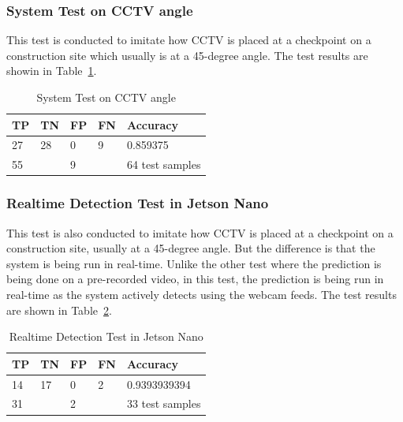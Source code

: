 \subsubsection{System Test on CCTV angle}
\label{subsubsec:hedect_test_cctv}

\par This test is conducted to imitate how CCTV is placed at a checkpoint on a construction site which usually is at a 45-degree angle. The test results are showin in Table~\ref{tb:systest_cctv}.

\begin{table}
  \centering
  \caption{System Test on CCTV angle}
  \label{tb:systest_cctv}
  \begin{tabular}{|l|l|l|l|l|} 
  \hline
  TP & TN & FP & FN & Accuracy         \\ 
  \hline
  27 & 28 & 0  & 9  & 0.859375         \\ 
  \hline
  \multicolumn{2}{|l|}{55}   & \multicolumn{2}{l|}{9} & 64 test samples  \\
  \hline
  \end{tabular}
\end{table}


\subsubsection{Realtime Detection Test in Jetson Nano}
\label{subsubsec:hedect_test_cctv_jetsonanno}

\par This test is also conducted to imitate how CCTV is placed at a checkpoint on a construction site, usually at a 45-degree angle. But the difference is that the system is being run in real-time. Unlike the other test where the prediction is being done on a pre-recorded video, in this test, the prediction is being run in real-time as the system actively detects using the webcam feeds. The test results are shown in Table~\ref{tb:systest_jetsonnano}.

\begin{table}
  \centering
  \caption{Realtime Detection Test in Jetson Nano}
  \label{tb:systest_jetsonnano}
  \begin{tabular}{|l|l|l|l|l|} 
  \hline
  TP & TN                    & FP & FN                & Accuracy         \\ 
  \hline
  14 & 17                    & 0  & 2                 & 0.9393939394     \\ 
  \hline
  \multicolumn{2}{|l|}{31}   & \multicolumn{2}{l|}{2} & 33 test samples  \\
  \hline
  \end{tabular}
\end{table}

